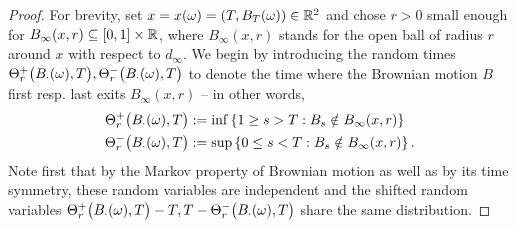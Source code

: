 \begin{proof}
  For brevity, set $x=x(\omega)=(T,B_T(\omega))\in\mathbb{R}^2$ and chose $r>0$ small enough for $B_\infty(x,r)\subseteq [0,1]\times\mathbb{R}$, where $B_\infty(x,r)$ stands for the open ball of radius $r$ around $x$ with respect to $d_\infty$.
  We begin by introducing the random times $\Theta^+_r\big(B_\cdot(\omega),T\big),\Theta^-_r\big(B_\cdot(\omega),T\big)$ to denote the time where the Brownian motion $B$ first resp. last exits $B_\infty(x,r)$ -- in other words,
  \begin{align}\label{eq:Theta}
    \Theta^+_r\big(B_\cdot(\omega),T\big)&:=\inf\left\{1\geq s>T:B_s\notin B_\infty(x,r)\right\}\notag\\
    \Theta^-_r\big(B_\cdot(\omega),T\big)&:=\sup\left\{0\leq s<T:B_s\notin B_\infty(x,r)\right\}.
  \end{align}
  Note first that by the Markov property of Brownian motion as well as by its time symmetry, these random variables are independent and the shifted random variables $\Theta^+_r\big(B_\cdot(\omega),T\big)-T,T-\Theta^-_r\big(B_\cdot(\omega),T\big)$ share the same distribution.
  

\end{proof}
